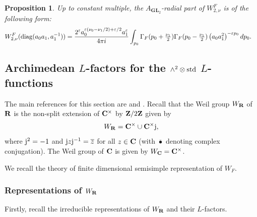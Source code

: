 \documentclass[11pt, reqno]{amsart}
\theoremstyle{plain}
\newtheorem{proposition}[theorem]{Proposition}
\theoremstyle{definition}
\theoremstyle{remark}
\theoremstyle{plain}
\def\Z{{\bf Z}}
\def\C{{\bf C}}
\def\R{{\bf R}}
\def\epsilon{\varepsilon}
\def\GL{\mathbf{GL}}
\begin{document}
\begin{proposition}{\cite[Proposition 2.5]{IshiiMultivariate}} \label{WhittakerSphericalForGL2} Up to constant multiple, the $A_{\GL_2}$-radial part of $W_{2,\nu}^F$ is of the following form:
\begin{align*}
    W_{2,\nu}^F({\rm diag}(a_0a_1,a_1^{-1})) &= \frac{2^{ \epsilon} a_0^{\epsilon(\nu_0 - \nu_1/2) + \epsilon/2} a_1^{\epsilon} }{4 \pi i} \int_{p_0} \Gamma_F(p_0 + \tfrac{\nu_1}{2})\Gamma_F(p_0 - \tfrac{\nu_1}{2}) \left(a_0 a_1^2 \right)^{-\epsilon p_0} dp_0.
\end{align*}
\end{proposition}



\subsection{Archimedean $L$-factors for the $\wedge^2 \otimes {\rm std}$ $L$-functions}\label{subsec:ArchimedeanLfactors}

The main references for this section are \cite{KnappLLCA} and \cite[\S 6.1]{HiranoIshiiMiyazakiGL4}. 
Recall that the Weil group $W_\R$ of $\R$ is the non-split extension of $\C^\times$ by $\Z/2\Z$ given by $$ W_\R = \C^\times \cup \C^\times  {\rm j},$$
where $ {\rm j}^2 = -1$ and $ {\rm j} z  {\rm j}^{-1} = \overline{z}$ for all $z \in \C$ (with $\overline{\bullet}$ denoting complex conjugation). The Weil group of $\C$ is given by $W_\C = \C^\times$. 

We recall the theory of finite dimensional semisimple representation of $W_F$.

\subsubsection{Representations of $W_\R$}

Firstly, recall the irreducible representations of $W_\R$ and their $L$-factors. 
\end{document}
